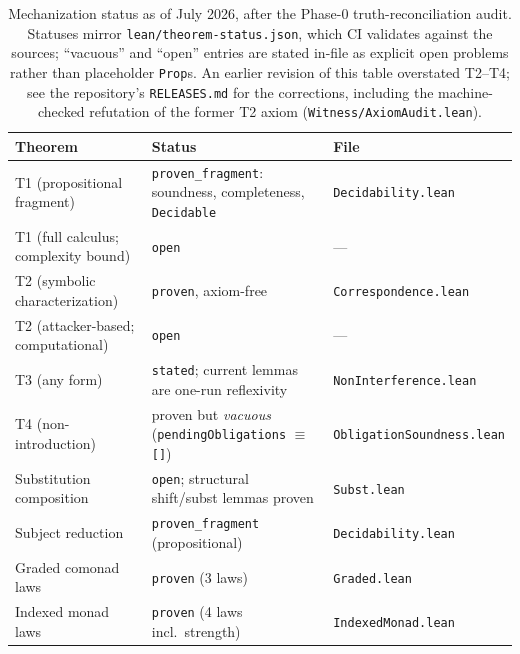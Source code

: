 \begin{table}[h]
\centering
\begin{tabular}{lll}
\toprule
Theorem & Status & File \\
\midrule
T1 (propositional fragment) & \texttt{proven\_fragment}: soundness, completeness, \texttt{Decidable} & \texttt{Decidability.lean} \\
T1 (full calculus; complexity bound) & \texttt{open} & --- \\
T2 (symbolic characterization) & \texttt{proven}, axiom-free & \texttt{Correspondence.lean} \\
T2 (attacker-based; computational) & \texttt{open} & --- \\
T3 (any form) & \texttt{stated}; current lemmas are one-run reflexivity & \texttt{NonInterference.lean} \\
T4 (non-introduction) & proven but \emph{vacuous} (\texttt{pendingObligations} $\equiv$ \texttt{[]}) & \texttt{ObligationSoundness.lean} \\
Substitution composition & \texttt{open}; structural shift/subst lemmas proven & \texttt{Subst.lean} \\
Subject reduction & \texttt{proven\_fragment} (propositional) & \texttt{Decidability.lean} \\
Graded comonad laws & \texttt{proven} (3 laws) & \texttt{Graded.lean} \\
Indexed monad laws & \texttt{proven} (4 laws incl.\ strength) & \texttt{IndexedMonad.lean} \\
\bottomrule
\end{tabular}
\caption{Mechanization status as of July 2026, after the Phase-0
truth-reconciliation audit.  Statuses mirror
\texttt{lean/theorem-status.json}, which CI validates against the
sources; ``vacuous'' and ``open'' entries are stated in-file as
explicit open problems rather than placeholder \texttt{Prop}s.  An
earlier revision of this table overstated T2--T4; see the repository's
\texttt{RELEASES.md} for the corrections, including the machine-checked
refutation of the former T2 axiom
(\texttt{Witness/AxiomAudit.lean}).}
\label{tab:status}
\end{table}
